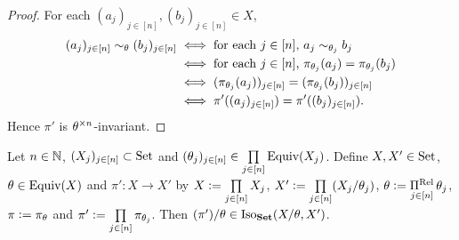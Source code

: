 \begin{proof}
	For each $(a_j)_{j \in [n]}, (b_j)_{j \in [n]} \in X$, 
	\begin{align*}
		(a_j)_{j \in [n]} \sim_{\theta} (b_j)_{j \in [n]} 
		& \iff \text{for each $j \in [n]$, $a_j \sim_{\theta_j} b_j$} \\
		& \iff \text{for each $j \in [n]$, $\pi_{\theta_j}(a_j) = \pi_{\theta_j}(b_j)$} \\
		& \iff (\pi_{\theta_j}(a_j))_{j \in [n]} = (\pi_{\theta_j}(b_j))_{j \in [n]} \\
		& \iff \pi'((a_j)_{j \in [n]}) = \pi'((b_j)_{j \in [n]}).
	\end{align*}
	Hence $\pi'$ is $\theta^{\times n}$-invariant.
\end{proof}

\begin{ex}
	Let $n \in \mathbb{N}$, $(X_j)_{j \in [n]} \subset \text{Set}$ and $(\theta_j)_{j \in [n]} \in \prod\limits_{j \in [n]} \operatorname*{\text{Equiv}}(X_j)$. Define $X, X' \in \text{Set}$, $\theta \in \operatorname*{\text{Equiv}}(X)$ and $\pi':X \rightarrow X'$ by $X \vcentcolon= \prod\limits_{j \in [n]} X_j$, $X' \vcentcolon= \prod\limits_{j \in [n]} (X_j/\theta_j)$, $\theta \vcentcolon= \operatorname*{\Pi^{\text{Rel}}}\limits_{j \in [n]} \theta_j$, $\pi \vcentcolon= \pi_{\theta}$ and $\pi' \vcentcolon= \prod\limits_{j \in [n]} \pi_{\theta_j}$. Then $(\pi')/\theta \in \operatorname{Iso}_{\text{\textbf{Set}}}(X/\theta, X')$.
\end{ex}

